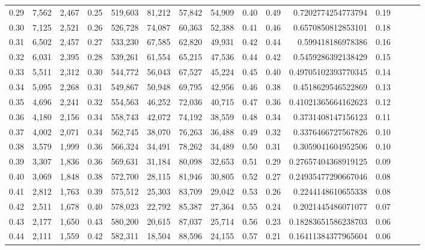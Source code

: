 \begin{tabular}{rrrrrrrrrrrrrrr}
0.29 &   7,562 &  2,467 &  0.25 &  519,603 &   81,212 &   57,842 &   54,909 &  0.40 &  0.49 &      0.7202774254773794 &      0.19 \\
0.30 &   7,125 &  2,521 &  0.26 &  526,728 &   74,087 &   60,363 &   52,388 &  0.41 &  0.46 &      0.6570850812853101 &      0.18 \\
0.31 &   6,502 &  2,457 &  0.27 &  533,230 &   67,585 &   62,820 &   49,931 &  0.42 &  0.44 &       0.599418186978386 &      0.16 \\
0.32 &   6,031 &  2,395 &  0.28 &  539,261 &   61,554 &   65,215 &   47,536 &  0.44 &  0.42 &      0.5459286392138429 &      0.15 \\
0.33 &   5,511 &  2,312 &  0.30 &  544,772 &   56,043 &   67,527 &   45,224 &  0.45 &  0.40 &     0.49705102393770345 &      0.14 \\
0.34 &   5,095 &  2,268 &  0.31 &  549,867 &   50,948 &   69,795 &   42,956 &  0.46 &  0.38 &      0.4518629546522869 &      0.13 \\
0.35 &   4,696 &  2,241 &  0.32 &  554,563 &   46,252 &   72,036 &   40,715 &  0.47 &  0.36 &     0.41021365664162623 &      0.12 \\
0.36 &   4,180 &  2,156 &  0.34 &  558,743 &   42,072 &   74,192 &   38,559 &  0.48 &  0.34 &      0.3731408147156123 &      0.11 \\
0.37 &   4,002 &  2,071 &  0.34 &  562,745 &   38,070 &   76,263 &   36,488 &  0.49 &  0.32 &      0.3376466727567826 &      0.10 \\
0.38 &   3,579 &  1,999 &  0.36 &  566,324 &   34,491 &   78,262 &   34,489 &  0.50 &  0.31 &      0.3059041604952506 &      0.10 \\
0.39 &   3,307 &  1,836 &  0.36 &  569,631 &   31,184 &   80,098 &   32,653 &  0.51 &  0.29 &     0.27657404368919125 &      0.09 \\
0.40 &   3,069 &  1,848 &  0.38 &  572,700 &   28,115 &   81,946 &   30,805 &  0.52 &  0.27 &     0.24935477290667046 &      0.08 \\
0.41 &   2,812 &  1,763 &  0.39 &  575,512 &   25,303 &   83,709 &   29,042 &  0.53 &  0.26 &      0.2244148610655338 &      0.08 \\
0.42 &   2,511 &  1,678 &  0.40 &  578,023 &   22,792 &   85,387 &   27,364 &  0.55 &  0.24 &      0.2021445486071077 &      0.07 \\
0.43 &   2,177 &  1,650 &  0.43 &  580,200 &   20,615 &   87,037 &   25,714 &  0.56 &  0.23 &     0.18283651586238703 &      0.06 \\
0.44 &   2,111 &  1,559 &  0.42 &  582,311 &   18,504 &   88,596 &   24,155 &  0.57 &  0.21 &     0.16411384377965604 &      0.06 \\

\end{tabular}
